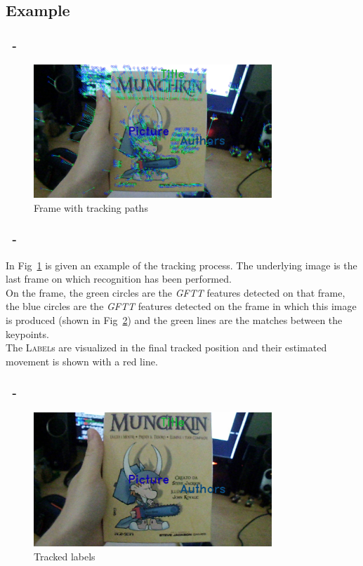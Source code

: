 \documentclass{beamer}
\begin{document}
  \subsection{Example}

  \begin{frame}
    \frametitle{\insertsection\ - \insertsubsection}
	\begin{figure}
		\centering
          \includegraphics[width=0.8\textwidth]{images/sampleTracking.jpg}
        \caption{Frame with tracking paths\label{fig:tracking-paths}}
	\end{figure}
  \end{frame}

  \begin{frame}
    \frametitle{\insertsection\ - \insertsubsection}
	In Fig~\ref{fig:tracking-paths} is given an example of the tracking
    process. The underlying image is the last frame on which recognition has
    been performed.\\
	On the frame, the green circles are the \emph{GFTT} features detected on
    that frame, the blue circles are the \emph{GFTT} features detected on the
    frame in which this image is produced (shown in
    Fig~\ref{fig:tracked-labels}) and the green lines are the matches between
    the keypoints.\\
	The \textsc{Label}s are visualized in the final tracked position and their
	estimated movement is shown with a red line.
  \end{frame}

  \begin{frame}
    \frametitle{\insertsection\ - \insertsubsection}
	\begin{figure}
		\centering
          \includegraphics[width=0.8\textwidth]{images/sampleFrame.jpg}
        \caption{Tracked labels\label{fig:tracked-labels}}
	\end{figure}
  \end{frame}
  
\end{document}
